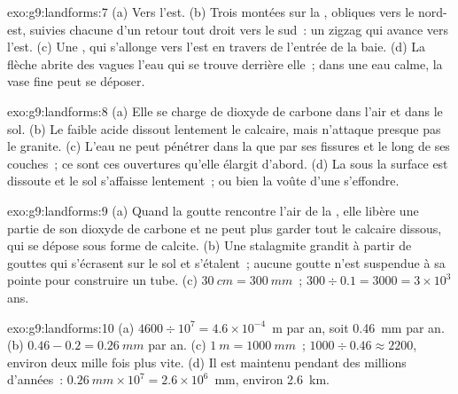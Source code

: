 \begin{solution}{exo:g9:landforms:7}
(a) Vers l'est. (b) Trois montées sur la , obliques vers le
nord-est, suivies chacune d'un retour tout droit vers le sud~: un zigzag
qui avance vers l'est. (c) Une , qui s'allonge vers l'est
en travers de l'entrée de la baie. (d) La flèche abrite des vagues l'eau
qui se trouve derrière elle~; dans une eau calme, la vase fine peut se
déposer.
\end{solution}

\begin{solution}{exo:g9:landforms:8}
(a) Elle se charge de dioxyde de carbone dans l'air et dans le sol. (b) Le
faible acide dissout lentement le calcaire, mais n'attaque presque pas le
granite. (c) L'eau ne peut pénétrer dans la  que par ses fissures et
le long de ses couches~; ce sont ces ouvertures qu'elle élargit d'abord.
(d) La  sous la surface est dissoute et le sol s'affaisse lentement~;
ou bien la voûte d'une  s'effondre.
\end{solution}

\begin{solution}{exo:g9:landforms:9}
(a) Quand la goutte rencontre l'air de la , elle libère une partie
de son dioxyde de carbone et ne peut plus garder tout le calcaire dissous,
qui se dépose sous forme de calcite. (b) Une stalagmite grandit à partir
de gouttes qui s'écrasent sur le sol et s'étalent~; aucune goutte n'est
suspendue à sa pointe pour construire un tube.
(c) $\qty{30}{cm} = \qty{300}{mm}$~; $300 \div 0.1 = 3000 = 3 \times 10^3$
ans.
\end{solution}

\begin{solution}{exo:g9:landforms:10}
(a) $4600 \div 10^7 = 4.6 \times 10^{-4}$~m par an, soit \qty{0.46}{mm}
par an. (b) $0.46 - 0.2 = \qty{0.26}{mm}$ par an. (c) $\qty{1}{m} =
\qty{1000}{mm}$~; $1000 \div 0.46 \approx 2200$, environ deux mille fois
plus vite. (d) Il est maintenu pendant des millions d'années~: $\qty{0.26}{mm} \times
10^7 = 2.6 \times 10^6$~mm, environ \qty{2.6}{km}.
\end{solution}


